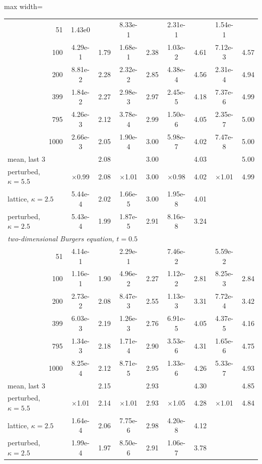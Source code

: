 \documentclass[smallextended]{svjour3}
\numberwithin{equation}{section}
\begin{document}
\begin{table}[!htbp]
\begin{adjustbox}{max width=\textwidth}
\begin{tabular}{rcccccccc}
51 & 1.43e0 &  & 8.33e-1 &  & 2.31e-1 &  & 1.54e-1 & \\
100 & 4.29e-1 & 1.79 & 1.68e-1 & 2.38 & 1.03e-2 & 4.61 & 7.12e-3 & 4.57\\
200 & 8.81e-2 & 2.28 & 2.32e-2 & 2.85 & 4.38e-4 & 4.56 & 2.31e-4 & 4.94\\
399 & 1.84e-2 & 2.27 & 2.98e-3 & 2.97 & 2.45e-5 & 4.18 & 7.37e-6 & 4.99\\
795 & 4.26e-3 & 2.12 & 3.78e-4 & 2.99 & 1.50e-6 & 4.05 & 2.35e-7 & 5.00\\
1000 & 2.66e-3 & 2.05 & 1.90e-4 & 3.00 & 5.98e-7 & 4.02 & 7.47e-8 & 5.00\\
\multicolumn{1}{l}{mean, last 3} &  & 2.08 &  & 3.00 &  & 4.03 &  & 5.00\\
\multicolumn{1}{l}{perturbed, $\kappa=5.5$} & $\times$0.99 & 2.08 & $\times$1.01 & 3.00 & $\times$0.98 & 4.02 & $\times$1.01 & 4.99\\
\multicolumn{1}{l}{lattice, $\kappa=2.5$} & 5.44e-4 & 2.02 & 1.66e-5 & 3.00 & 1.95e-8 & 4.01 &  & \\
\multicolumn{1}{l}{perturbed, $\kappa=2.5$} & 5.43e-4 & 1.99 & 1.87e-5 & 2.91 & 8.16e-8 & 3.24 &  & \\
\midrule
\multicolumn{9}{l}{\emph{two-dimensional Burgers equation, $t=0.5$}}\\
51 & 4.14e-1 &  & 2.29e-1 &  & 7.46e-2 &  & 5.59e-2 & \\
100 & 1.16e-1 & 1.90 & 4.96e-2 & 2.27 & 1.12e-2 & 2.81 & 8.25e-3 & 2.84\\
200 & 2.73e-2 & 2.08 & 8.47e-3 & 2.55 & 1.13e-3 & 3.31 & 7.72e-4 & 3.42\\
399 & 6.03e-3 & 2.19 & 1.26e-3 & 2.76 & 6.91e-5 & 4.05 & 4.37e-5 & 4.16\\
795 & 1.34e-3 & 2.18 & 1.71e-4 & 2.90 & 3.53e-6 & 4.31 & 1.65e-6 & 4.75\\
1000 & 8.25e-4 & 2.12 & 8.71e-5 & 2.95 & 1.33e-6 & 4.26 & 5.33e-7 & 4.93\\
\multicolumn{1}{l}{mean, last 3} &  & 2.15 &  & 2.93 &  & 4.30 &  & 4.85\\
\multicolumn{1}{l}{perturbed, $\kappa=5.5$} & $\times$1.01 & 2.14 & $\times$1.01 & 2.93 & $\times$1.05 & 4.28 & $\times$1.01 & 4.84\\
\multicolumn{1}{l}{lattice, $\kappa=2.5$} & 1.64e-4 & 2.06 & 7.75e-6 & 2.98 & 4.20e-8 & 4.12 &  & \\
\multicolumn{1}{l}{perturbed, $\kappa=2.5$} & 1.99e-4 & 1.97 & 8.50e-6 & 2.91 & 1.06e-7 & 3.78 &  & \\
\bottomrule
\end{tabular}
\end{adjustbox}
\end{table}
\end{document}
